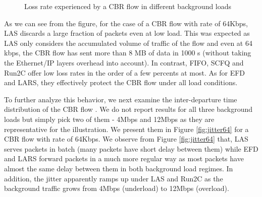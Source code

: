 \documentclass[preprint,12pt]{elsarticle}
\begin{document}
\begin{figure}[ht!]
   \centering
  	\caption{Loss rate experienced by a CBR flow in different background loads}
  	\label{fig:loss_rate}  
\end{figure}

As we can see from the figure, for the case of a CBR flow with rate of 64Kbps, LAS discards a large fraction of packets even at low load. This was expected as LAS only considers the accumulated volume of traffic of the flow and even at 64 kbps, the CBR flow has sent more than 8 MB of data in 1000 s (without taking the Ethernet/IP layers overhead into account). In contrast, FIFO, SCFQ and Run2C offer low loss rates in the order of a few percents at most. As for EFD and LARS, they effectively protect the CBR flow under all load conditions.

To further analyze this behavior, we next examine the inter-departure time distribution of the CBR flow \cite{Martin10Lars}. We do not report results for all three background loads but simply pick two of them  - 4Mbps and 12Mbps as they are representative for the illustration. We present them in Figure \ref{fig:jitter64} for a CBR flow with rate of 64Kbps.  We observe from Figure \ref{fig:jitter64} that, LAS serves packets in batch (many packets have short delay between them) while EFD and LARS forward packets in a much more regular way as most packets have almost the same delay between them in both background load regimes. In addition, the jitter apparently ramps up under LAS and Run2C as the background traffic grows from 4Mbps (underload) to 12Mbps (overload). 
\end{document}
